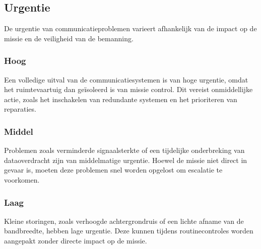 \subsection{Urgentie}
De urgentie van communicatieproblemen varieert afhankelijk van de impact op de missie en de veiligheid van de bemanning.

\subsubsection{Hoog}
Een volledige uitval van de communicatiesystemen is van hoge urgentie, omdat het ruimtevaartuig dan geïsoleerd is van missie control. Dit vereist onmiddellijke actie, zoals het inschakelen van redundante systemen en het prioriteren van reparaties.

\subsubsection{Middel}
Problemen zoals verminderde signaalsterkte of een tijdelijke onderbreking van dataoverdracht zijn van middelmatige urgentie. Hoewel de missie niet direct in gevaar is, moeten deze problemen snel worden opgelost om escalatie te voorkomen.

\subsubsection{Laag}
Kleine storingen, zoals verhoogde achtergrondruis of een lichte afname van de bandbreedte, hebben lage urgentie. Deze kunnen tijdens routinecontroles worden aangepakt zonder directe impact op de missie.